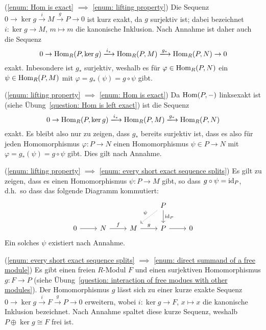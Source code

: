 \begin{solution}
  (\ref{enum: Hom is exact} $\implies$ \ref{enum: lifting property})
  Die Sequenz $0 \to \ker g \xrightarrow{i} M \xrightarrow{g} P \to 0$ ist kurz exakt, da $g$ surjektiv ist;
  dabei bezeichnet $i \colon \ker g \to M$, $m \mapsto m$ die kanonische Inklusion.
  Nach Annahme ist daher auch die Sequenz
  \[
                          0
    \to                   \Hom_R(P, \ker g)
    \xlongrightarrow{i_*} \Hom_R(P, M)
    \xlongrightarrow{g_*} \Hom_R(P, N)
    \to                   0
  \]
  exakt.
  Inbesondere ist $g_*$ surjektiv, weshalb es für $\varphi \in \operatorname{Hom}_R(P,N)$ ein $\psi \in \operatorname{Hom}_R(P,M)$ mit $\varphi = g_*(\psi) = g \circ \psi$ gibt.
  
  (\ref{enum: lifting property} $\implies$ \ref{enum: Hom is exact})
  Da $\operatorname{Hom}(P,-)$ linksexakt ist (siehe Übung~\ref{question: Hom is left exact}) ist die Sequenz
  \[
                          0
    \to                   \Hom_R(P, \ker g)
    \xlongrightarrow{i_*} \Hom_R(P, M)
    \xlongrightarrow{g_*} \Hom_R(P, N)
  \]
  exakt.
  Es bleibt also nur zu zeigen, dass $g_*$ bereits surjektiv ist, dass es also für jeden Homomorphismus $\varphi \colon P \to N$ einen Homomorphismus $\psi \in P \to N$ mit $\varphi = g_*(\psi) = g \circ \psi$ gibt.
  Dies gilt nach Annahme.
  
  (\ref{enum: lifting property} $\implies$ \ref{enum: every short exact sequence splits})
  Es gilt zu zeigen, dass es einen Homomorphismus $\psi \colon P \to M$ gibt, so dass $g \circ \psi = \operatorname{id}_P$, d.h.\ so dass das folgende Diagramm kommutiert:
  \[
    \begin{tikzcd}[ampersand replacement = \&]
        {}
    \&  {}
    \&  {}
    \&  P
        \arrow{d}{\id_P}
        \arrow[densely dotted, swap]{dl}{\psi}
    \&  {}
    \\
        0
        \arrow{r}
    \&  N
        \arrow{r}{f}
    \&  M
        \arrow{r}{g}
    \&  P
        \arrow{r}
    \&  0
    \end{tikzcd}
  \]
  Ein solches $\psi$ existiert nach Annahme.
  
  (\ref{enum: every short exact sequence splits} $\implies$ \ref{enum: direct summand of a free module})
  Es gibt einen freien $R$-Modul $F$ und einen surjektiven Homomorphismus $g \colon F \to P$ (siehe Übung~\ref{question: interaction of free modues with other modules}).
  Der Homomorphismus $g$ lässt sich zu einer kurze exakte Sequenz $0 \to \ker g \xrightarrow{i} F \xrightarrow{g} P \to 0$ erweitern, wobei $i \colon \ker g \to F$, $x \mapsto x$ die kanonische Inklusion bezeichnet.
  Nach Annahme spaltet diese kurze Sequenz, weshalb $P \oplus {\ker g} \cong F$ frei ist.
  

\end{solution}
